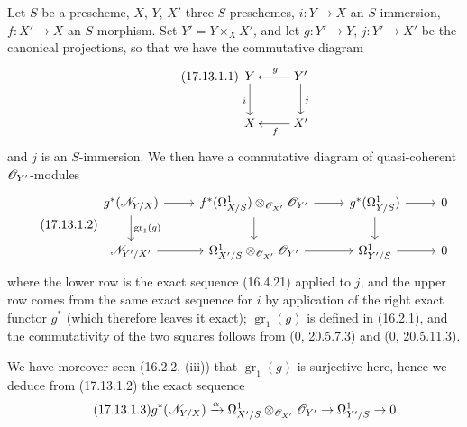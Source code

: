 \begin{env}[17.13.1]
\label{IV.17.13.1}
Let $S$ be a prescheme, $X$, $Y$, $X'$ three $S$-preschemes, $i:Y\to X$ an $S$-immersion, $f:X'\to X$ an $S$-morphism. Set $Y'=Y\times_XX'$, and let $g:Y'\to Y$, $j:Y'\to X'$ be the canonical projections, so that we have the commutative diagram
\[
\label{IV.17.13.1.1}
\tag{17.13.1.1}
\xymatrix{
  Y \ar[d]_i & Y' \ar[l]_g \ar[d]^j\\
  X & X' \ar[l]^f
}
\]
and $j$ is an $S$-immersion. We then have a commutative diagram of quasi-coherent $\mathscr{O}_{Y'}$-modules
\[
\label{IV.17.13.1.2}
\tag{17.13.1.2}
\begin{tikzcd}
  g^*(\sh{N}_{Y/X}) \ar{r} \ar{d}{\operatorname{gr}_1(g)} & f^*(\Omega^1_{X/S})\otimes_{\sh{O}_{X'}}\sh{O}_{Y'} \ar{r} \ar{d} & g^*(\Omega^1_{Y/S}) \ar{r} \ar{d} & 0\\
  \sh{N}_{Y'/X'} \ar{r} & \Omega^1_{X'/S}\otimes_{\sh{O}_{X'}}\sh{O}_{Y'} \ar{r} & \Omega^1_{Y'/S} \ar{r} & 0
\end{tikzcd}
\]
where the lower row is the exact sequence (16.4.21) applied to $j$, and the upper row comes from the same exact sequence for $i$ by application of the right exact functor $g^*$ (which therefore leaves it exact); $\operatorname{gr}_1(g)$ is defined in (16.2.1), and the commutativity of the two squares follows from (0, 20.5.7.3) and (0, 20.5.11.3).


We have moreover seen (16.2.2, (iii)) that $\operatorname{gr}_1(g)$ is surjective here, hence we deduce from (17.13.1.2) the exact sequence
\[
\label{IV.17.13.1.3}
\tag{17.13.1.3}
g^*(\mathscr{N}_{Y/X})\xrightarrow{\alpha}\Omega^1_{X'/S}\otimes_{\mathscr{O}_{X'}}\mathscr{O}_{Y'}\to\Omega^1_{Y'/S}\to0.
\]
\end{env}

